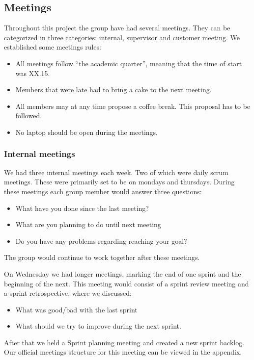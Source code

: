 \subsection{Meetings}
Throughout this project the group have had several meetings. They can be
categorized in three categories: internal, supervisor and customer
meeting. We established some meetings rules:
\begin{itemize}
    \item All meetings follow ``the academic quarter'', meaning that the time
        of start was XX.15.
    \item Members that were late had to bring a cake to the next meeting. 
    \item All members may at any time propose a coffee break. This proposal has
        to be followed. 
    \item No laptop should be open during the meetings. 
\end{itemize}
\subsubsection{Internal meetings}
We had three internal meetings each week. Two of which were daily scrum
meetings. These were primarily set to be on mondays and thursdays.
During these meetings each group member would answer three questions: 
\begin{itemize}
    \item What have you done since the last meeting?
    \item What are you planning to do until next meeting
    \item Do you have any problems regarding reaching your goal? 
\end{itemize}
The group would continue to work together after these meetings. 

On Wednesday we had longer meetings, marking the end of one sprint and
the beginning of the next. This meeting would consist of a sprint
review meeting and a sprint retrospective, where we discussed: 
\begin{itemize}
    \item What was good/bad with the last sprint
    \item What should we try to improve during the next sprint. 
\end{itemize}
After that we held a Sprint planning meeting and created a new sprint
backlog. Our official meetings structure for this meeting can be viewed
in the appendix. 

